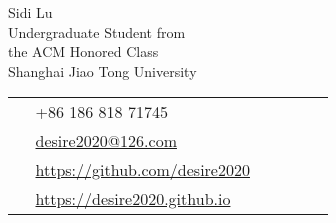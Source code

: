\documentclass[10pt]{article} %
\begin{document}
\begin{paracol}{2} %


\parbox[top][0.12\textheight][c]{\linewidth}{ %
	\vspace{-0.04\textheight} %
	\centering %
	{\sffamily\Huge Sidi Lu}\\\medskip %
	{\color{headings} Undergraduate Student from}\\
	{\color{headings} the ACM Honored Class}\\
	{\color{headings} Shanghai Jiao Tong University}
}
\parbox[top][0.12\textheight][c]{\linewidth}{ %
	\vspace{-0.04\textheight} %
	\colorbox{shade}{ %
		\begin{supertabular}{p{0.05\linewidth}|p{0.775\linewidth}} %
			\raisebox{-1pt}{\faPhone} & +86 186 818 71745 \\ %
			\raisebox{0pt}{\small\faEnvelope} & \href{mailto:desire2020@126.com}{desire2020@126.com} \\ %
			\raisebox{-1pt}{\small\faGithub} & \href{https://github.com/desire2020}{https://github.com/desire2020} \\ %
			\raisebox{-1pt}{\faHome} & \href{https://desire2020.github.io}{https://desire2020.github.io} \\ %
		\end{supertabular}
	}
}


\end{paracol}
\end{document}
